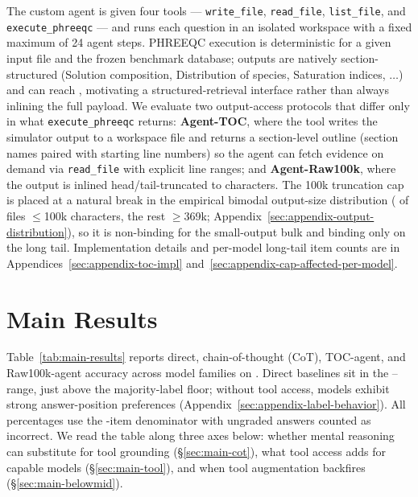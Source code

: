 \documentclass{article}
\begin{document}
The custom agent is given four tools --- \texttt{write\_file}, \texttt{read\_file}, \texttt{list\_file}, and \texttt{execute\_phreeqc} --- and runs each question in an isolated workspace with a fixed maximum of 24 agent steps. PHREEQC execution is deterministic for a given input file and the frozen benchmark database; outputs are natively section-structured (Solution composition, Distribution of species, Saturation indices, $\dots$) and can reach \OutputMaxChars{}, motivating a structured-retrieval interface rather than always inlining the full payload. We evaluate two output-access protocols that differ only in what \texttt{execute\_phreeqc} returns: \textbf{Agent-TOC}, where the tool writes the simulator output to a workspace file and returns a section-level outline (section names paired with starting line numbers) so the agent can fetch evidence on demand via \texttt{read\_file} with explicit line ranges; and \textbf{Agent-Raw100k}, where the output is inlined head/tail-truncated to \RawCapChars{} characters. The 100k truncation cap is placed at a natural break in the empirical bimodal output-size distribution (\OutputLeHundredK{} of files $\le$100k characters, the rest $\ge$369k; Appendix~\ref{sec:appendix-output-distribution}), so it is non-binding for the small-output bulk and binding only on the long tail. Implementation details and per-model long-tail item counts are in Appendices~\ref{sec:appendix-toc-impl} and~\ref{sec:appendix-cap-affected-per-model}.

\section{Main Results}
\label{sec:main-results}

Table~\ref{tab:main-results} reports direct, chain-of-thought (CoT), TOC-agent, and Raw100k-agent accuracy across model families on \BenchName. Direct baselines sit in the \GPTFiveFourOneShot--\OpusOneShot{} range, just above the \BenchMajority{} majority-label floor; without tool access, models exhibit strong answer-position preferences (Appendix~\ref{sec:appendix-label-behavior}). All percentages use the \BenchN-item denominator with ungraded answers counted as incorrect. We read the table along three axes below: whether mental reasoning can substitute for tool grounding (§\ref{sec:main-cot}), what tool access adds for capable models (§\ref{sec:main-tool}), and when tool augmentation backfires (§\ref{sec:main-belowmid}).
\end{document}
